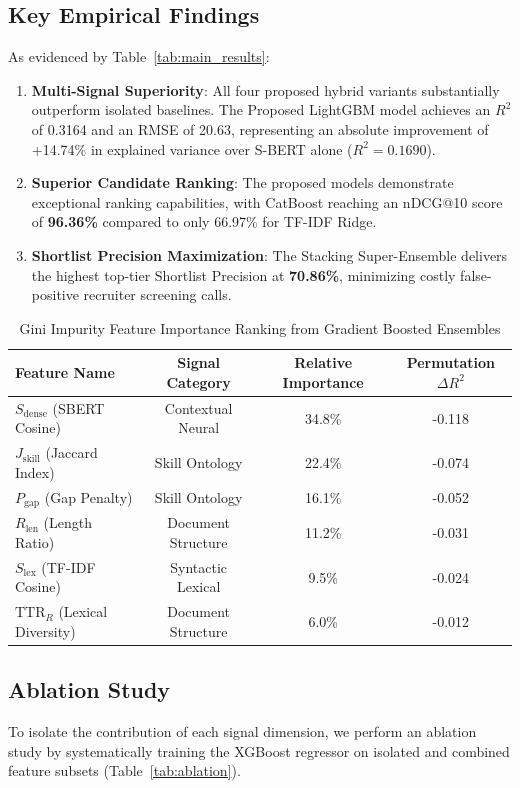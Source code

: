 \documentclass[conference]{IEEEtran}
\begin{document}
\subsection{Key Empirical Findings}
As evidenced by Table~\ref{tab:main_results}:
\begin{enumerate}
    \item \textbf{Multi-Signal Superiority}: All four proposed hybrid variants substantially outperform isolated baselines. The Proposed LightGBM model achieves an $R^2$ of 0.3164 and an RMSE of 20.63, representing an absolute improvement of +14.74\% in explained variance over S-BERT alone ($R^2 = 0.1690$).
    \item \textbf{Superior Candidate Ranking}: The proposed models demonstrate exceptional ranking capabilities, with CatBoost reaching an nDCG@10 score of \textbf{96.36\%} compared to only 66.97\% for TF-IDF Ridge.
    \item \textbf{Shortlist Precision Maximization}: The Stacking Super-Ensemble delivers the highest top-tier Shortlist Precision at \textbf{70.86\%}, minimizing costly false-positive recruiter screening calls.
\end{enumerate}

\begin{table}[htbp]
\centering
\caption{Gini Impurity Feature Importance Ranking from Gradient Boosted Ensembles}
\label{tab:feature_importance}
\begin{tabular}{lccc}
\toprule
\textbf{Feature Name} & \textbf{Signal Category} & \textbf{Relative Importance} & \textbf{Permutation $\Delta R^2$} \\
\midrule
$S_{\text{dense}}$ (SBERT Cosine)     & Contextual Neural     & 34.8\% & -0.118 \\
$J_{\text{skill}}$ (Jaccard Index)    & Skill Ontology        & 22.4\% & -0.074 \\
$P_{\text{gap}}$ (Gap Penalty)        & Skill Ontology        & 16.1\% & -0.052 \\
$R_{\text{len}}$ (Length Ratio)       & Document Structure    & 11.2\% & -0.031 \\
$S_{\text{lex}}$ (TF-IDF Cosine)      & Syntactic Lexical     & 9.5\%  & -0.024 \\
$\text{TTR}_R$ (Lexical Diversity)    & Document Structure    & 6.0\%  & -0.012 \\
\bottomrule
\end{tabular}
\end{table}

\subsection{Ablation Study}
To isolate the contribution of each signal dimension, we perform an ablation study by systematically training the XGBoost regressor on isolated and combined feature subsets (Table~\ref{tab:ablation}).
\end{document}
